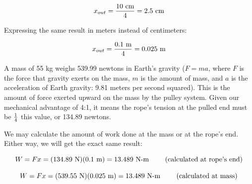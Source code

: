 $$x_{out} = {10 \hbox{ cm} \over 4} = 2.5 \hbox{ cm}$$

Expressing the same result in meters instead of centimeters:

$$x_{out} = {0.1 \hbox{ m} \over 4} = 0.025 \hbox{ m}$$

\vskip 10pt

A mass of 55 kg weighs 539.99 newtons in Earth's gravity ($F = ma$, where $F$ is the force that gravity exerts on the mass, $m$ is the amount of mass, and $a$ is the acceleration of Earth gravity: 9.81 meters per second squared).  This is the amount of force exerted upward on the mass by the pulley system.  Given our mechanical advantage of 4:1, it means the rope's tension at the pulled end must be $1 \over 4$ this value, or 134.89 newtons.

\vskip 10pt

We may calculate the amount of work done at the mass or at the rope's end.  Either way, we will get the exact same result:

\vskip 10pt

$$W = F x = (134.89 \hbox{ N}) (0.1 \hbox{ m}) = 13.489 \hbox{ N-m \hskip 20pt (calculated at rope's end)}$$

$$W = F x = (539.55 \hbox{ N}) (0.025 \hbox{ m}) = 13.489 \hbox{ N-m \hskip 20pt (calculated at mass)}$$












